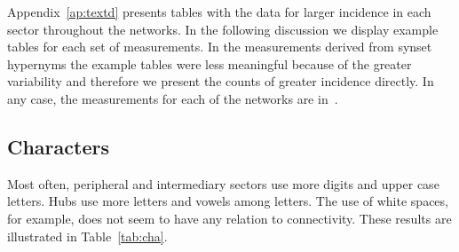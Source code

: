 																																												Appendix~\ref{ap:textd} presents tables with the data for larger incidence in each sector throughout the networks. In the following discussion we display example tables for each set of measurements.
																																												In the measurements derived from synset hypernyms the example tables were less meaningful because of the greater variability and therefore we present the counts of greater incidence directly.
																																												In any case, the measurements for each of the networks are in~\cite{textTables}.


																																												\subsection{Characters}\label{sec:cha}
																																												Most often, peripheral and intermediary sectors use more digits and upper case letters. Hubs use more letters and vowels among letters.
																																												The use of white spaces, for example, does not seem to have any relation to connectivity. 
																																												These results are illustrated in Table~\ref{tab:cha}.
																																												
																																												\FloatBarrier

